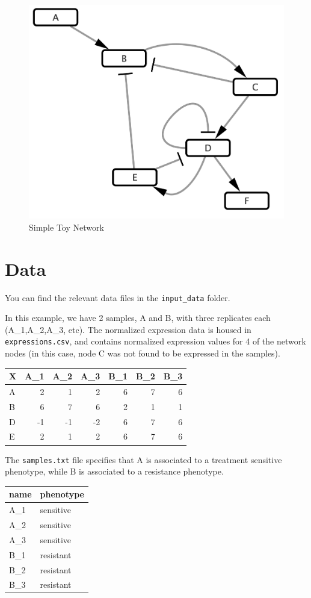 \documentclass[
]{book}
\theoremstyle{definition}
\theoremstyle{definition}
\theoremstyle{definition}
\theoremstyle{definition}
\theoremstyle{remark}
\begin{document}
\begin{figure}

{\centering \includegraphics[width=0.5\linewidth]{images/toy_network} 

}

\caption{Simple Toy Network}\label{fig:unnamed-chunk-2}
\end{figure}

\hypertarget{data}{%
\section{Data}\label{data}}

You can find the relevant data files in the \texttt{input\_data} folder.

In this example, we have 2 samples, A and B, with three replicates each (A\_1,A\_2,A\_3, etc).
The normalized expression data is housed in \texttt{expressions.csv}, and contains normalized expression values for 4 of the network nodes (in this case, node C was not found to be expressed in the samples).

\begin{tabular}{l|r|r|r|r|r|r}
\hline
X & A\_1 & A\_2 & A\_3 & B\_1 & B\_2 & B\_3\\
\hline
A & 2 & 1 & 2 & 6 & 7 & 6\\
\hline
B & 6 & 7 & 6 & 2 & 1 & 1\\
\hline
D & -1 & -1 & -2 & 6 & 7 & 6\\
\hline
E & 2 & 1 & 2 & 6 & 7 & 6\\
\hline
\end{tabular}

The \texttt{samples.txt} file specifies that A is associated to a treatment sensitive phenotype, while B is associated to a resistance phenotype.

\begin{tabular}{l|l}
\hline
name & phenotype\\
\hline
A\_1 & sensitive\\
\hline
A\_2 & sensitive\\
\hline
A\_3 & sensitive\\
\hline
B\_1 & resistant\\
\hline
B\_2 & resistant\\
\hline
B\_3 & resistant\\
\hline
\end{tabular}
\end{document}
